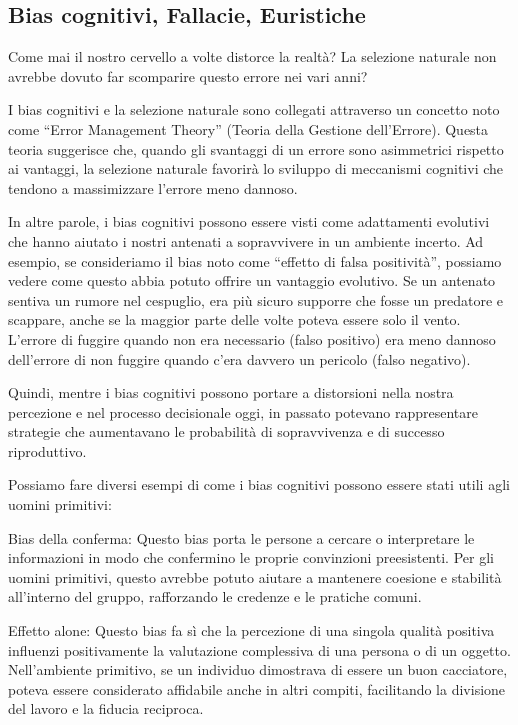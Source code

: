 \documentclass[12pt]{book} %
\begin{document}
\subsection{Bias cognitivi, Fallacie, Euristiche}
Come mai il nostro cervello a volte distorce la realtà? La selezione naturale non avrebbe
dovuto far scomparire questo errore nei vari anni?

I bias cognitivi e la selezione naturale sono collegati attraverso un concetto noto come “Error Management Theory”
(Teoria della Gestione dell'Errore). Questa teoria suggerisce che, quando gli svantaggi di un
errore sono asimmetrici rispetto ai vantaggi, la selezione naturale favorirà lo sviluppo di meccanismi cognitivi che
tendono a massimizzare l'errore meno dannoso.

In altre parole, i bias cognitivi possono essere visti come adattamenti evolutivi che hanno aiutato i nostri antenati a
sopravvivere in un ambiente incerto. Ad esempio, se consideriamo il bias noto come “effetto di falsa positività”,
possiamo vedere come questo abbia potuto offrire un vantaggio evolutivo. Se un antenato sentiva un rumore nel
cespuglio, era più sicuro supporre che fosse un predatore e scappare, anche se la maggior parte delle volte poteva
essere solo il vento. L'errore di fuggire quando non era necessario (falso positivo) era meno
dannoso dell'errore di non fuggire quando c'era davvero un pericolo (falso
negativo).

Quindi, mentre i bias cognitivi possono portare a distorsioni nella nostra percezione e nel processo decisionale oggi,
in passato potevano rappresentare strategie che aumentavano le probabilità di sopravvivenza e di successo riproduttivo.

Possiamo fare diversi esempi di come i bias cognitivi possono essere stati utili agli uomini primitivi:

Bias della conferma: Questo bias porta le persone a cercare o interpretare le informazioni in modo che confermino le
proprie convinzioni preesistenti. Per gli uomini primitivi, questo avrebbe potuto aiutare a mantenere coesione e
stabilità all'interno del gruppo, rafforzando le credenze e le pratiche comuni.

Effetto alone: Questo bias fa sì che la percezione di una singola qualità positiva influenzi positivamente la
valutazione complessiva di una persona o di un oggetto. Nell'ambiente primitivo, se un individuo
dimostrava di essere un buon cacciatore, poteva essere considerato affidabile anche in altri compiti, facilitando la
divisione del lavoro e la fiducia reciproca.
\end{document}
